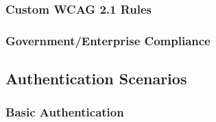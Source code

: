 \subsubsection{Custom WCAG 2.1 Rules}\label{custom-wcag-2.1-rules}

\begin{Shaded}
\begin{Highlighting}[]
\FunctionTok{\{}
  \FunctionTok{:} \FunctionTok{\{}
    \FunctionTok{:} \FunctionTok{,}
    \FunctionTok{:} \OtherTok{[}
      \OtherTok{,}
    \OtherTok{]}
  \FunctionTok{\}}
\FunctionTok{\}}
\end{Highlighting}
\end{Shaded}

\subsubsection{Government/Enterprise
Compliance}\label{governmententerprise-compliance}

\begin{Shaded}
\begin{Highlighting}[]
\FunctionTok{\{}
  \FunctionTok{:} \FunctionTok{\{}
    \FunctionTok{:} \FunctionTok{,}
    \FunctionTok{:} \OtherTok{[}\OtherTok{,} \OtherTok{]}\FunctionTok{,}
    \FunctionTok{:} \FunctionTok{,}
    \FunctionTok{:} \FunctionTok{,}
    \FunctionTok{:} \OtherTok{[}
    \OtherTok{]}
  \FunctionTok{\}}
\FunctionTok{\}}
\end{Highlighting}
\end{Shaded}

\subsection{Authentication Scenarios}\label{authentication-scenarios}

\subsubsection{Basic Authentication}\label{basic-authentication}


